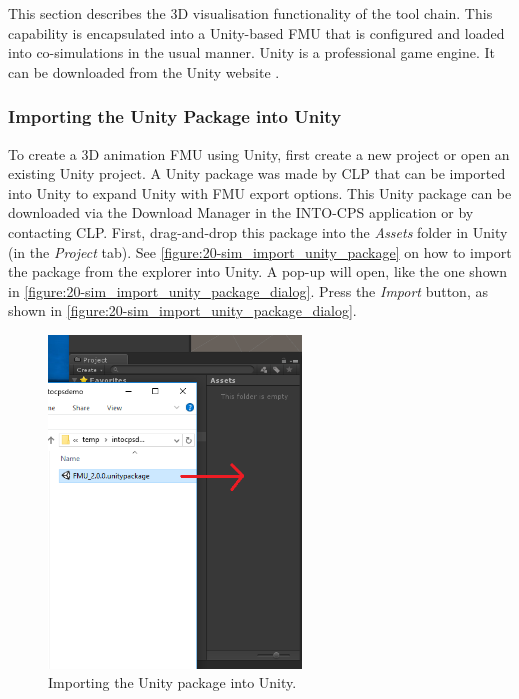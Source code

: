 This section describes the 3D visualisation functionality of the \into tool chain.
%
This capability is encapsulated into a Unity-based FMU that is configured and loaded into co-simulations in the usual manner.
%
Unity is a professional game engine.
%
It can be downloaded from the Unity website \cite{UnityWebsite}. 

\subsubsection{Importing the Unity Package into Unity}
To create a 3D animation FMU using Unity, first create a new project or open an existing Unity project. A Unity package was made by CLP that can be imported into Unity to expand Unity with FMU export options. This Unity package can be downloaded via the Download Manager in the INTO-CPS application or by contacting CLP.
%
First, drag-and-drop this package into the \textit{Assets} folder in Unity (in the \textit{Project} tab). See \autoref{figure:20-sim_import_unity_package} on how to import the package from the explorer into Unity. A pop-up will open, like the one shown in \autoref{figure:20-sim_import_unity_package_dialog}. Press the \textit{Import} button, as shown in \autoref{figure:20-sim_import_unity_package_dialog}.
%
\begin{figure}[ht]
	\centerline{\includegraphics[width=0.6\textwidth]{figures/20sim_Unity1.png}}
	\caption{Importing the Unity package into Unity.}
	\label{figure:20-sim_import_unity_package}
\end{figure}
%
